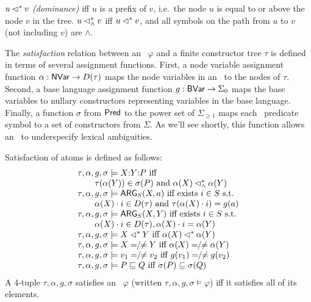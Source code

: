 \begin{definition}\label{defn:dominance}
  $u \lhd^* v$ \emph{(dominance)} iff $u$ is a prefix of $v$, i.e.\ the node
  $u$ is equal to or above the node $v$ in the tree.
  $u \lhd^*_\wedge v$ iff $u \lhd^* v$, and all symbols on the path from $u$
  to $v$ (not including $v$) are $\wedge$.
\end{definition}

The {\em satisfaction} relation between an \rmrs\ $\varphi$ and a
finite constructor tree $\tau$ is defined in terms of several
assignment functions.  First, a node variable assignment function
$\alpha: \mathsf{NVar} \rightarrow D(\tau)$ maps the node variables in an
\rmrs\ to the nodes of $\tau$.  Second, a base language assignment
function $g:\mathsf{BVar} \rightarrow \Sigma_0$ maps the base variables to
nullary constructors representing variables in the base
language. Finally, a function $\sigma$ from $\mathsf{Pred}$ to the power set
of $\Sigma_{\geq 1}$ maps each \rmrs\ predicate symbol to a set of
constructors from $\Sigma$.  As we'll see shortly, this function
allows an \rmrs\ to underspecify lexical ambiguities.

\begin{definition}\label{defn:satisfaction}
Satisfaction of atoms is defined as follows:
$$
\begin{array}{l}
  \tau, \alpha, g, \sigma \models  \ep{X}{Y}{P}
\mbox{ iff}\\
\qquad \tau(\alpha(Y)) \in \sigma(P) \mbox{ and } \alpha(X) \wedgedom
  \alpha(Y) \\
  \tau, \alpha, g, \sigma \models \ARG_S(X,a)
\mbox{ iff exists  $i \in S$ s.t.}\\
\qquad  \alpha(X) \cdot i \in D(\tau) \mbox{ and }
  \tau(\alpha(X) \cdot 
  i) = g(a) \\
  \tau, \alpha, g, \sigma \models \ARG_S(X,Y)
\mbox{ iff  exists $i \in S$ s.t.}\\
\qquad \alpha(X) \cdot i \in D(\tau), \alpha(X) \cdot
  i = \alpha(Y)\\
  \tau, \alpha, g, \sigma \models X \dom Y
\mbox{ iff } \alpha(X) \dom \alpha(Y) \\
  \tau, \alpha, g, \sigma \models X =  \!\!/\!\! \neq Y
\mbox{ iff }  \alpha(X) =  \!\!/\!\! \neq \alpha(Y) \\
  \tau, \alpha, g, \sigma \models v_1 =  \!\!/\!\! \neq v_2
\mbox{ iff }  g(v_1) = \!\!/\!\! \neq g(v_2) \\
  \tau, \alpha, g, \sigma \models P \spec Q
\mbox{ iff $\sigma(P) \subseteq \sigma(Q)$}
\end{array}
$$
A 4-tuple $\tau,\alpha,g,\sigma$ satisfies an \rmrs\ $\varphi$
(written $\tau,\alpha,g,\sigma \models \varphi$) iff it satisfies all
of its elements.
\end{definition}

